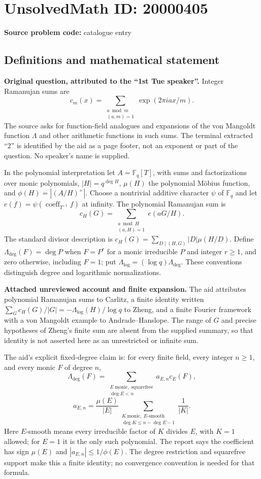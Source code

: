 \documentclass[11pt]{article}
\newcommand{\F}{\mathbb{F}}
\begin{document}
\section*{UnsolvedMath ID: 20000405}
\textbf{Source problem code:} catalogue entry
\subsection{Definitions and mathematical statement}
\textbf{Original question, attributed to the ``1st Tue speaker''.} Integer Ramanujan sums are
\[c_m(x)=\sum_{\substack{a\bmod m\\(a,m)=1}}\exp(2\pi iax/m).\]
The source asks for function-field analogues and expansions of the von Mangoldt function $\Lambda$ and other arithmetic functions in such sums. The terminal extracted ``2'' is identified by the aid as a page footer, not an exponent or part of the question. No speaker's name is supplied.

In the polynomial interpretation let $A=\F_q[T]$, with sums and factorizations over monic polynomials, $|H|=q^{\deg H}$, $\mu(H)$ the polynomial Möbius function, and $\phi(H)=|(A/H)^\times|$. Choose a nontrivial additive character $\psi$ of $\F_q$ and let $e(f)=\psi(\operatorname{coeff}_{T^{-1}}f)$ at infinity. The polynomial Ramanujan sum is
\[c_H(G)=\sum_{\substack{a\bmod H\\(a,H)=1}}e(aG/H).\]
The standard divisor description is $c_H(G)=\sum_{D\mid(H,G)}|D|\mu(H/D)$. Define $\Lambda_{\deg}(F)=\deg P$ when $F=P^r$ for a monic irreducible $P$ and integer $r\ge1$, and zero otherwise, including $F=1$; put $\Lambda_{\log}=(\log q)\Lambda_{\deg}$. These conventions distinguish degree and logarithmic normalizations.

\textbf{Attached unreviewed account and finite expansion.} The aid attributes polynomial Ramanujan sums to Carlitz, a finite identity written $\sum_Gc_H(G)/|G|=-\Lambda_{\log}(H)/\log q$ to Zheng, and a finite Fourier framework with a von Mangoldt example to Andrade--Hanslope. The range of $G$ and precise hypotheses of Zheng's finite sum are absent from the supplied summary, so that identity is not asserted here as an unrestricted or infinite sum.

The aid's explicit fixed-degree claim is: for every finite field, every integer $n\ge1$, and every monic $F$ of degree $n$,
\[\Lambda_{\deg}(F)=\sum_{\substack{E\ \mathrm{monic,\ squarefree}\\\deg E<n}}a_{E,n}c_E(F),\]
\[a_{E,n}=\frac{\mu(E)}{|E|}\sum_{\substack{K\ \mathrm{monic},\ E\text{-smooth}\\\deg K\le n-\deg E-1}}\frac1{|K|}.\]
Here $E$-smooth means every irreducible factor of $K$ divides $E$, with $K=1$ allowed; for $E=1$ it is the only such polynomial. The report says the coefficient has sign $\mu(E)$ and $|a_{E,n}|\le1/\phi(E)$. The degree restriction and squarefree support make this a finite identity; no convergence convention is needed for that formula.
\end{document}
